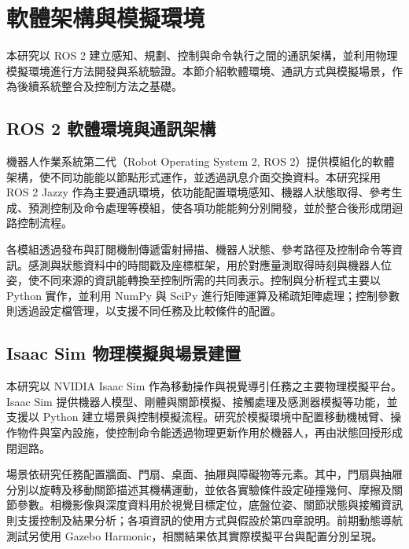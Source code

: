 
\section{軟體架構與模擬環境}
\label{sec:software_simulation}

本研究以 ROS 2 建立感知、規劃、控制與命令執行之間的通訊架構，並利用物理模擬環境進行方法開發與系統驗證。本節介紹軟體環境、通訊方式與模擬場景，作為後續系統整合及控制方法之基礎。

\subsection{ROS 2 軟體環境與通訊架構}
\label{subsec:ros2_architecture}

機器人作業系統第二代（Robot Operating System 2, ROS 2）提供模組化的軟體架構，使不同功能能以節點形式運作，並透過訊息介面交換資料\cite{macenski2022ros2}。本研究採用 ROS 2 Jazzy 作為主要通訊環境，依功能配置環境感知、機器人狀態取得、參考生成、預測控制及命令處理等模組，使各項功能能夠分別開發，並於整合後形成閉迴路控制流程。

各模組透過發布與訂閱機制傳遞雷射掃描、機器人狀態、參考路徑及控制命令等資訊。感測與狀態資料中的時間戳及座標框架，用於對應量測取得時刻與機器人位姿，使不同來源的資訊能轉換至控制所需的共同表示。控制與分析程式主要以 Python 實作，並利用 NumPy 與 SciPy 進行矩陣運算及稀疏矩陣處理；控制參數則透過設定檔管理，以支援不同任務及比較條件的配置。

\subsection{Isaac Sim 物理模擬與場景建置}
\label{subsec:isaac_sim_environment}

本研究以 NVIDIA Isaac Sim 作為移動操作與視覺導引任務之主要物理模擬平台。Isaac Sim 提供機器人模型、剛體與關節模擬、接觸處理及感測器模擬等功能，並支援以 Python 建立場景與控制模擬流程\cite{nvidiaisaacsim}。研究於模擬環境中配置移動機械臂、操作物件與室內設施，使控制命令能透過物理更新作用於機器人，再由狀態回授形成閉迴路。

場景依研究任務配置牆面、門扇、桌面、抽屜與障礙物等元素。其中，門扇與抽屜分別以旋轉及移動關節描述其機構運動，並依各實驗條件設定碰撞幾何、摩擦及關節參數。相機影像與深度資料用於視覺目標定位，底盤位姿、關節狀態與接觸資訊則支援控制及結果分析；各項資訊的使用方式與假設於第四章說明。前期動態導航測試另使用 Gazebo Harmonic，相關結果依其實際模擬平台與配置分別呈現。

